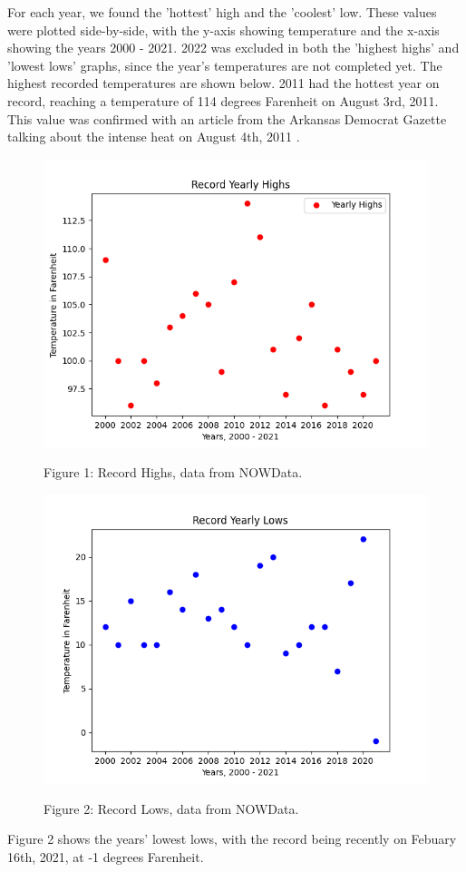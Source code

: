 For each year, we found the 'hottest' high and the 'coolest' low. These values were plotted side-by-side, with the y-axis showing temperature and the x-axis showing the years 2000 - 2021. 2022 was excluded in both the 'highest highs' and 'lowest lows' graphs, since the year's temperatures are not completed yet. The highest recorded temperatures are shown below. 2011 had the hottest year on record, reaching a temperature of 114 degrees Farenheit on August 3rd, 2011. This value was confirmed with an article from the Arkansas Democrat Gazette talking about the intense heat on August 4th, 2011 \cite{historic_high}.

\begin{figure}[h!]
\centering
\includegraphics[scale=0.8]{Highs.png}
\label{Figure 1: Record Highs}
\caption{Figure 1: Record Highs, data from NOWData.}
\end{figure}
\FloatBarrier

\begin{figure}[h!]
\centering
\includegraphics[scale=0.8]{Lows.png}
\label{Figure 2: Record Lows}
\caption{Figure 2: Record Lows, data from NOWData.}
\end{figure}
\FloatBarrier

Figure 2 shows the years' lowest lows, with the record being recently on Febuary 16th, 2021, at -1 degrees Farenheit.
